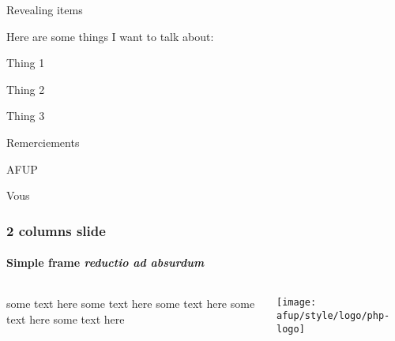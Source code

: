 \documentclass{beamer}
\begin{document}
\begin{frame}{Revealing items}

	\newenvironment{wideitemize}{\itemize\addtolength{\itemsep}{10pt}}{\enditemize}

	Here are some things I want to talk about:\\
	\vspace{.5cm}
	\begin{wideitemize}
		\item<1->{Thing 1}
		\item<2->{Thing 2}
		\item<3>{Thing 3}
	\end{wideitemize}
\end{frame}

\begin{frame}{Remerciements}

	\newenvironment{wideitemize}{\itemize\addtolength{\itemsep}{10pt}}{\enditemize}

	\vspace{.5cm}
	\begin{wideitemize}
		\item<1->{AFUP}
		\item<2->{Vous}
	\end{wideitemize}
\end{frame}

\begin{frame}
	\frametitle{2 columns slide}
	\framesubtitle{Simple frame \textit{reductio ad absurdum}}
	\begin{columns}
		\begin{column}{0.5\textwidth}
			some text here some text here some text here some text here some text here
		\end{column}
		\begin{column}{0.5\textwidth}
			\begin{center}
				\texttt{[image: afup/style/logo/php-logo]}
			\end{center}
		\end{column}
	\end{columns}
\end{frame}
\end{document}
